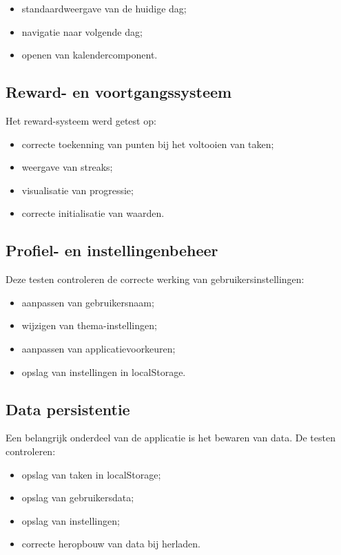 \begin{itemize}
    \item standaardweergave van de huidige dag;
    \item navigatie naar volgende dag;
    \item openen van kalendercomponent.
\end{itemize}

\subsection{Reward- en voortgangssysteem}

Het reward-systeem werd getest op:

\begin{itemize}
    \item correcte toekenning van punten bij het voltooien van taken;
    \item weergave van streaks;
    \item visualisatie van progressie;
    \item correcte initialisatie van waarden.
\end{itemize}

\subsection{Profiel- en instellingenbeheer}

Deze testen controleren de correcte werking van gebruikersinstellingen:

\begin{itemize}
    \item aanpassen van gebruikersnaam;
    \item wijzigen van thema-instellingen;
    \item aanpassen van applicatievoorkeuren;
    \item opslag van instellingen in localStorage.
\end{itemize}

\subsection{Data persistentie}

Een belangrijk onderdeel van de applicatie is het bewaren van data. De testen controleren:

\begin{itemize}
    \item opslag van taken in localStorage;
    \item opslag van gebruikersdata;
    \item opslag van instellingen;
    \item correcte heropbouw van data bij herladen.
\end{itemize}

